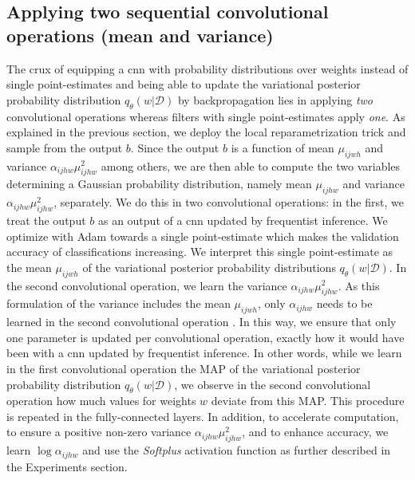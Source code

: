 \subsection{Applying two sequential convolutional operations (mean and variance)}
The crux of equipping a \ac{cnn} with probability distributions over weights instead of single point-estimates and being able to update the variational posterior probability distribution $q_{\theta}(w|\mathcal{D})$ by backpropagation lies in applying \textit{two} convolutional operations whereas filters with single point-estimates apply \textit{one}. As explained in the previous section, we deploy the local reparametrization trick and sample from the output $b$. Since the output $b$ is a function of mean $\mu_{ijwh}$ and variance $\alpha_{ijhw}\mu^2_{ijhw}$ among others, we are then able to compute the two variables determining a Gaussian probability distribution, namely mean $\mu_{ijhw}$ and variance $\alpha_{ijhw}\mu^2_{ijhw}$, separately. 
\newline We do this in two convolutional operations: in the first, we treat the output $b$ as an output of a \ac{cnn} updated by frequentist inference. We optimize with Adam \cite{kingma2014adam} towards a single point-estimate which makes the validation accuracy of classifications increasing. We interpret this single point-estimate as the mean $\mu_{ijwh}$ of the variational posterior probability distributions $q_{\theta}(w|\mathcal{D})$. In the second convolutional operation, we learn the variance $\alpha_{ijhw}\mu^2_{ijhw}$. As this formulation of the variance includes the mean $\mu_{ijwh}$, only $\alpha_{ijhw}$ needs to be learned in the second convolutional operation \cite{molchanov2017variational}. In this way, we ensure that only one parameter is updated per convolutional operation, exactly how it would have been with a \ac{cnn} updated by frequentist inference. 
\newline In other words, while we learn in the first convolutional operation the MAP of the variational posterior probability distribution $q_{\theta}(w|\mathcal{D})$, we observe in the second convolutional operation how much values for weights $w$ deviate from this MAP. This procedure is repeated in the fully-connected layers. In addition, to accelerate computation, to ensure a positive non-zero variance $\alpha_{ijhw}\mu^2_{ijhw}$, and to enhance accuracy, we learn $\log \alpha_{ijhw}$ and use the \textit{Softplus} activation function as further described in the Experiments section.
%
